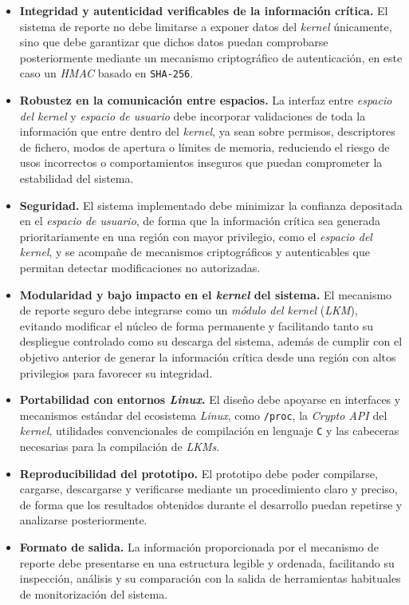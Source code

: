 \begin{itemize}
    \item \textbf{Integridad y autenticidad verificables de la información crítica.} El sistema de reporte no debe limitarse a exponer datos del \textit{kernel} únicamente, sino que debe garantizar que dichos datos puedan comprobarse posteriormente mediante un mecanismo criptográfico de autenticación, en este caso un \textit{HMAC} basado en \texttt{SHA-256}.
    \item \textbf{Robustez en la comunicación entre espacios.} La interfaz entre \textit{espacio del kernel} y \textit{espacio de usuario} debe incorporar validaciones de toda la información que entre dentro del \textit{kernel}, ya sean sobre permisos, descriptores de fichero, modos de apertura o límites de memoria, reduciendo el riesgo de usos incorrectos o comportamientos inseguros que puedan comprometer la estabilidad del sistema.
    \item \textbf{Seguridad.} El sistema implementado debe minimizar la confianza depositada en el \textit{espacio de usuario}, de forma que la información crítica sea generada prioritariamente en una región con mayor privilegio, como el \textit{espacio del kernel}, y se acompañe de mecanismos criptográficos y autenticables que permitan detectar modificaciones no autorizadas.
    \item \textbf{Modularidad y bajo impacto en el \textit{kernel} del sistema.} El mecanismo de reporte seguro debe integrarse como un \textit{módulo del kernel} (\textit{LKM}), evitando modificar el núcleo de forma permanente y facilitando tanto su despliegue controlado como su descarga del sistema, además de cumplir con el objetivo anterior de generar la información crítica desde una región con altos privilegios para favorecer su integridad.
    \item \textbf{Portabilidad con entornos \textit{Linux}.} El diseño debe apoyarse en interfaces y mecanismos estándar del ecosistema \textit{Linux}, como \texttt{/proc}, la \textit{Crypto API} del \textit{kernel}, utilidades convencionales de compilación en lenguaje \texttt{C} y las cabeceras necesarias para la compilación de \textit{LKMs}.
    \item \textbf{Reproducibilidad del prototipo.} El prototipo debe poder compilarse, cargarse, descargarse y verificarse mediante un procedimiento claro y preciso, de forma que los resultados obtenidos durante el desarrollo puedan repetirse y analizarse posteriormente.
    \item \textbf{Formato de salida.} La información proporcionada por el mecanismo de reporte debe presentarse en una estructura legible y ordenada, facilitando su inspección, análisis y su comparación con la salida de herramientas habituales de monitorización del sistema.
\end{itemize}

